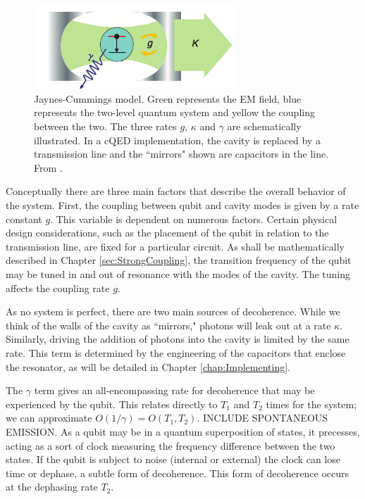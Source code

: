 \documentclass[11 pt, oneside]{book} %
\begin{document}
\begin{figure}[h] 
   \centering
   \includegraphics[width=3in]{Semba-Toy-cQED.png} 
   \caption[Jaynes Cummings model]{Jaynes-Cummings model. Green represents the EM field, blue represents the two-level quantum system and yellow the coupling between the two. The three rates $g$, $\kappa$ and $\gamma$ are schematically illustrated. In a cQED implementation, the cavity is replaced by a transmission line and the ``mirrors" shown are capacitors in the line. From \cite{Semba}.}
   \label{fig:ToycQED}
\end{figure}

Conceptually there are three main factors that describe the overall behavior of the system. First, the coupling between qubit and cavity modes is given by a rate constant $g$. This variable is dependent on numerous factors. Certain physical design considerations, such as the placement of the qubit in relation to the transmission line, are fixed for a particular circuit. As shall be mathematically described in Chapter \ref{sec:StrongCoupling}, the transition frequency of the qubit may be tuned in and out of resonance with the modes of the cavity. The tuning affects the coupling rate $g$. 

As no system is perfect, there are two main sources of decoherence. While we think of the walls of the cavity as ``mirrors," photons will leak out at a rate $\kappa$. Similarly, driving the addition of photons into the cavity is limited by the same rate. This term is determined by the engineering of the capacitors that enclose the resonator, as will be detailed in Chapter \ref{chap:Implementing}. 

The $\gamma$ term gives an all-encompassing rate for decoherence that may be experienced by the qubit. This relates directly to $T_1$ and $T_2$ times for the system; we can approximate $O(1/\gamma)= O(T_1,T_2)$. INCLUDE SPONTANEOUS EMISSION. As a qubit may be in a quantum superposition of states, it precesses, acting as a sort of clock measuring the frequency difference between the two states. If the qubit is subject to noise (internal or external) the clock can lose time or dephase, a subtle form of decoherence.\cite{Schuster} This form of decoherence occurs at the dephasing rate $T_2$.
\end{document}
